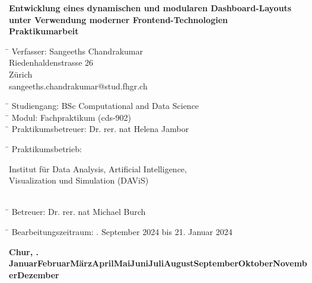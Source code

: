 \documentclass[a4paper, 12pt]{scrartcl}
\begin{document}
\begin{center}
	{\LARGE\textbf{Entwicklung eines dynamischen und modularen Dashboard-Layouts unter Verwendung moderner Frontend-Technologien}}\\
	\vspace{40mm} %
	{\large\textbf{Praktikumarbeit}}\\
	\vspace{40mm}

\begin{flushleft}
	\begin{tabbing}
		\hspace*{73mm}\= \kill
		Verfasser: \> Sangeeths Chandrakumar\\
		\> Riedenhaldenstrasse 26\\
		 Zürich\\
		\> {sangeeths.chandrakumar@stud.fhgr.ch}\\
	\end{tabbing}
	
	\begin{tabbing}
		\hspace*{73mm}\= \kill
		Studiengang: \> BSc Computational and Data Science\\
		\hspace*{73mm}\= \kill
		Modul: \> Fachpraktikum (cds-902)\\
		\hspace*{73mm}\= \kill
		Praktikumsbetreuer: \> Dr. rer. nat Helena Jambor\\
	\end{tabbing}

    \begin{tabbing}
        \hspace*{73mm}\= \kill
        Praktikumsbetrieb: \> \parbox[t]{0.6\textwidth}{Institut für Data Analysis, Artificial Intelligence, \\ Visualization und Simulation (DAViS)}\\
        \hspace*{73mm}\= \kill
        Betreuer: \> Dr. rer. nat Michael Burch\\
    \end{tabbing}
 
	\begin{tabbing}
		\hspace*{73mm}\= \kill
		Bearbeitungszeitraum: . September 2024 bis  21. Januar 2024 \\
	\end{tabbing}
	
\end{flushleft}

\vspace{10mm}

\newcommand{\ausgeschriebenerMonat}[1]{%
    \ifcase#1\or Januar\or Februar\or März\or April\or Mai\or Juni\or Juli\or August\or September\or Oktober\or November\or Dezember\fi%
}

\newcommand{\datum}{%
    \textbf{Chur, \number\day.\ausgeschriebenerMonat{\month} \number\year}
}
\datum

\end{center}
\end{document}
